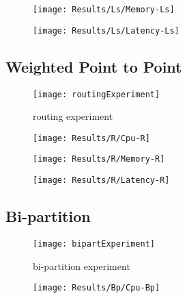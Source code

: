\begin{figure}[htbp]
    \centering
    \texttt{[image: Results/Ls/Memory-Ls]}
    \label{fig:gantt}
\end{figure}

\begin{figure}[htbp]
    \centering
    \texttt{[image: Results/Ls/Latency-Ls]}
    \label{fig:gantt}
\end{figure}

\newpage



\subsection{Weighted Point to Point} %
\label{sec:weighted point to point}

\begin{figure}[htbp]
    \centering
    \texttt{[image: routingExperiment]}
    \caption{routing experiment}
    \label{fig:gantt}
\end{figure}

\begin{figure}[htbp]
    \centering
    \texttt{[image: Results/R/Cpu-R]}
    \label{fig:gantt}
\end{figure}

\begin{figure}[htbp]
    \centering
    \texttt{[image: Results/R/Memory-R]}
    \label{fig:gantt}
\end{figure}

\begin{figure}[htbp]
    \centering
    \texttt{[image: Results/R/Latency-R]}
    \label{fig:gantt}
\end{figure}

\newpage



\subsection{Bi-partition} %
\label{sec:bi-partition}

\begin{figure}[htbp]
    \centering
    \texttt{[image: bipartExperiment]}
    \caption{bi-partition experiment}
    \label{fig:gantt}
\end{figure}

\begin{figure}[htbp]
    \centering
    \texttt{[image: Results/Bp/Cpu-Bp]}
    \label{fig:gantt}
\end{figure}

